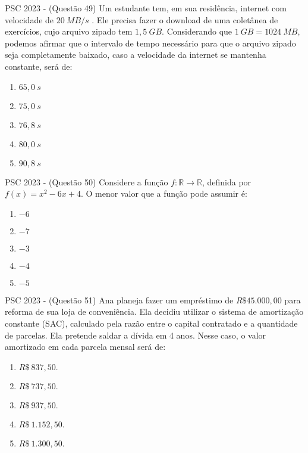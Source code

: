 \documentclass[aspectratio=169]{beamer}
\newif\ifusarcorvermelha
\newcommand{\vermelho}[1]{%
    \ifusarcorvermelha
        {\color{red}#1}%
    \else
        #1%
    \fi
}
\begin{document}
    \begin{frame}{PSC 2023 - (Questão 49)}
        Um estudante tem, em sua residência, internet com velocidade de $20\  MB/s$ . Ele precisa fazer o download de uma coletânea de exercícios, cujo arquivo zipado tem $1,5 \ GB$. Considerando que $1\ GB = 1024\ MB$, podemos afirmar que o intervalo de tempo necessário para que o arquivo zipado seja completamente baixado, caso a velocidade da internet se mantenha constante, será de:
        
            \begin{enumerate}[a]
                \item $65,0 \ s$
                \item $75,0 \ s$
                \item \vermelho{$76,8 \ s$} %
                \item $80,0 \ s$
                \item $90,8 \ s$
            \end{enumerate}
    
    \end{frame}

    \begin{frame}{PSC 2023 - (Questão 50)}
        Considere a função $f: \mathbb{R} \to \mathbb{R}$, definida por $f(x)=x^{2}-6x+4$. O menor valor que a função pode assumir é:

            \begin{enumerate}[a]
                \item $-6$
                \item $-7$
                \item $-3$
                \item $-4$
                \item \vermelho{$-5$} %
            \end{enumerate}
    
    \end{frame}

    \begin{frame}{PSC 2023 - (Questão 51)}
        Ana planeja fazer um empréstimo de $R\$ 45.000,00$ para reforma de sua loja de conveniência. Ela decidiu utilizar o sistema de amortização constante (SAC), calculado pela razão entre o capital contratado e a quantidade de parcelas. Ela pretende saldar a dívida em 4 anos. Nesse caso, o valor amortizado em cada parcela mensal será de:

            \begin{enumerate}[a]
                \item $R\$ \ 837,50.$
                \item $R\$ \ 737,50.$
                \item \vermelho{$R\$ \ 937,50.$} %
                \item $R\$ \ 1.152,50.$ 
                \item $R\$ \ 1.300,50.$ 
            \end{enumerate}
    
    \end{frame}
\end{document}
